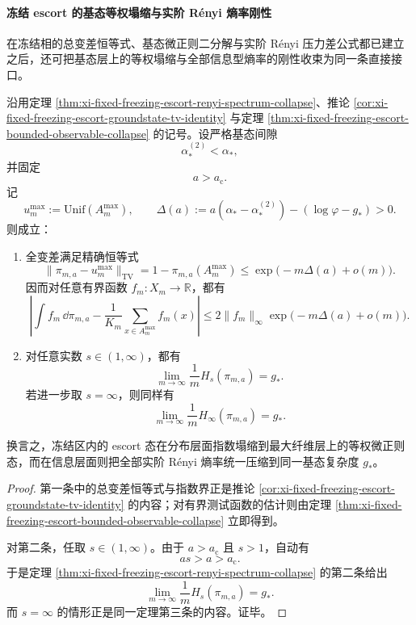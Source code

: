 \paragraph{冻结 escort 的基态等权塌缩与实阶 Rényi 熵率刚性}
在冻结相的总变差恒等式、基态微正则二分解与实阶 Rényi 压力差公式都已建立之后，还可把基态层上的等权塌缩与全部信息型熵率的刚性收束为同一条直接接口。

\begin{corollary}\label{cor:xi-time-part57bb-freezing-groundstate-equidistribution-renyi-rigidity}
沿用定理 \ref{thm:xi-fixed-freezing-escort-renyi-spectrum-collapse}、推论 \ref{cor:xi-fixed-freezing-escort-groundstate-tv-identity} 与定理 \ref{thm:xi-fixed-freezing-escort-bounded-observable-collapse} 的记号。设严格基态间隙
\[
\alpha_*^{(2)}<\alpha_*,
\]
并固定
\[
a>a_{\mathrm c}.
\]
记
\[
u_m^{\max}:=\mathrm{Unif}(A_m^{\max}),
\qquad
\Delta(a):=a(\alpha_*-\alpha_*^{(2)})-(\log\varphi-g_*)>0.
\]
则成立：
\begin{enumerate}
  \item 全变差满足精确恒等式
  \[
  \|\pi_{m,a}-u_m^{\max}\|_{\mathrm{TV}}
  =
  1-\pi_{m,a}(A_m^{\max})
  \le
  \exp\!\bigl(-m\Delta(a)+o(m)\bigr).
  \]
  因而对任意有界函数 \(f_m:X_m\to\mathbb R\)，都有
  \[
  \left|
  \int f_m\,\dd\pi_{m,a}
  -
  \frac1{K_m}\sum_{x\in A_m^{\max}}f_m(x)
  \right|
  \le
  2\|f_m\|_\infty
  \exp\!\bigl(-m\Delta(a)+o(m)\bigr).
  \]
  \item 对任意实数 \(s\in(1,\infty)\)，都有
  \[
  \lim_{m\to\infty}\frac1m H_s(\pi_{m,a})=g_*.
  \]
  若进一步取 \(s=\infty\)，则同样有
  \[
  \lim_{m\to\infty}\frac1m H_\infty(\pi_{m,a})=g_*.
  \]
\end{enumerate}
换言之，冻结区内的 escort 态在分布层面指数塌缩到最大纤维层上的等权微正则态，而在信息层面则把全部实阶 Rényi 熵率统一压缩到同一基态复杂度 \(g_*\)。
\end{corollary}
\begin{proof}
第一条中的总变差恒等式与指数界正是推论 \ref{cor:xi-fixed-freezing-escort-groundstate-tv-identity} 的内容；对有界测试函数的估计则由定理 \ref{thm:xi-fixed-freezing-escort-bounded-observable-collapse} 立即得到。

对第二条，任取 \(s\in(1,\infty)\)。由于 \(a>a_{\mathrm c}\) 且 \(s>1\)，自动有
\[
as>a>a_{\mathrm c}.
\]
于是定理 \ref{thm:xi-fixed-freezing-escort-renyi-spectrum-collapse} 的第二条给出
\[
\lim_{m\to\infty}\frac1m H_s(\pi_{m,a})=g_*.
\]
而 \(s=\infty\) 的情形正是同一定理第三条的内容。证毕。
\end{proof}

\endinput
